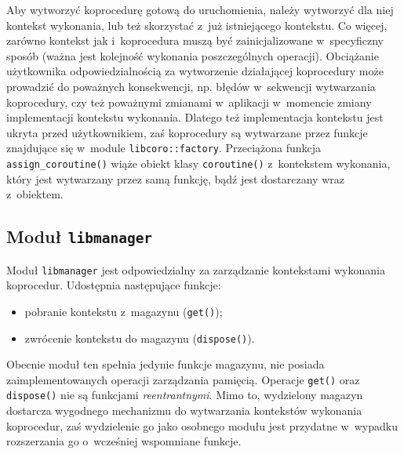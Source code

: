 \documentclass[11pt,makeidx]{mwart}
\newcommand{\code}{\texttt}
\newcommand{\dcolon}{::}
\newcommand{\procbr}{()}
\begin{document}
\par
%
\indent
	Aby wytworzyć koprocedurę gotową do uruchomienia, należy wytworzyć dla niej kontekst wykonania, lub też skorzystać z~już istniejącego
	kontekstu. Co więcej, zarówno kontekst jak i~koprocedura muszą być zainicjalizowane w~specyficzny sposób (ważna jest kolejność wykonania
	poszczególnych operacji). Obciążanie użytkownika odpowiedzialnością za wytworzenie działającej koprocedury może prowadzić do poważnych
	konsekwencji, np. błędów w~sekwencji wytwarzania koprocedury, czy też poważnymi zmianami w~aplikacji w~momencie zmiany implementacji
	kontekstu wykonania. Dlatego też implementacja kontekstu jest ukryta przed użytkownikiem, zaś koprocedury są wytwarzane przez funkcje znajdujące
	się w~module \code{libcoro\dcolon factory}. Przeciążona funkcja \code{assign\_coroutine\procbr} wiąże obiekt klasy \code{coroutine\procbr}
	z~kontekstem wykonania, który jest wytwarzany przez samą funkcję, bądź jest dostarczany wraz z~obiektem.
\par
%
\subsection{Moduł \code{libmanager}}
\indent
	Moduł \code{libmanager} jest odpowiedzialny za zarządzanie kontekstami wykonania koprocedur. Udostępnia następujące funkcje:
	\begin{itemize}
		\item pobranie kontekstu z~magazynu (\code{get\procbr});
		\item zwrócenie kontekstu do magazynu (\code{dispose\procbr}).
	\end{itemize}
	Obecnie moduł ten spełnia jedynie funkcje magazynu, nie posiada zaimplementowanych operacji zarządzania pamięcią.
	Operacje \code{get\procbr} oraz \code{dispose\procbr} nie są funkcjami \emph{reentrantnymi}.
	Mimo to, wydzielony magazyn dostarcza wygodnego mechanizmu do wytwarzania kontekstów wykonania koprocedur, zaś wydzielenie
	go jako osobnego modułu jest przydatne w~wypadku rozszerzania go o~wcześniej wspomniane funkcje.
\par
%
\end{document}
